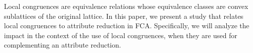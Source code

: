 
Local congruences are equivalence relations whose equivalence classes are convex sublattices of the original lattice. In this paper, we present a study that relates local congruences to attribute reduction in FCA. Specifically,   we will analyze the impact in the context of the use of local congruences, when they are used  for complementing an attribute reduction.



